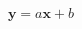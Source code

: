\documentclass[12pt]{standalone}
\begin{document}
	\begin{varwidth}{50in}
		\begin{equation*}
		\mathbf{y} = \mathit{a} \mathbf{x} + \mathit{b}				
		\end{equation*}
	\end{varwidth}
	
\vspace{2cm}
\end{document}
